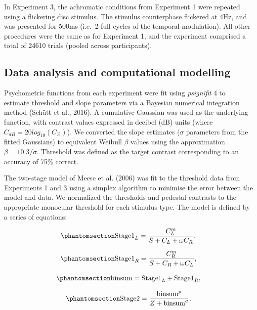 \documentclass[
  letterpaper,
  DIV=11,
  numbers=noendperiod]{scrartcl}
\begin{document}
In Experiment 3, the achromatic conditions from Experiment 1 were
repeated using a flickering disc stimulus. The stimulus counterphase
flickered at 4Hz, and was presented for 500ms (i.e.~2 full cycles of the
temporal modulation). All other procedures were the same as for
Experiment 1, and the experiment comprised a total of 24610 trials
(pooled across participants).

\subsection{Data analysis and computational
modelling}\label{data-analysis-and-computational-modelling}

Psychometric functions from each experiment were fit using
\emph{psignifit} 4 to estimate threshold and slope parameters via a
Bayesian numerical integration method (Schütt et al., 2016). A
cumulative Gaussian was used as the underlying function, with contrast
values expressed in decibel (dB) units (where
\(C_{dB} = 20log_{10}(C_\%)\)). We converted the slope estimates
(\(\sigma\) parameters from the fitted Gaussians) to equivalent Weibull
\(\beta\) values using the approximation \(\beta = 10.3/\sigma\).
Threshold was defined as the target contrast corresponding to an
accuracy of 75\% correct.

The two-stage model of Meese et al. (2006) was fit to the threshold data
from Experiments 1 and 3 using a simplex algorithm to minimise the error
between the model and data. We normalized the thresholds and pedestal
contrasts to the appropriate monocular threshold for each stimulus type.
The model is defined by a series of equations:

\begin{equation}\phantomsection\label{eq-s1l}{\mathrm{Stage1}_L = \frac{C_L^m}{S + C_L + \omega C_R},}\end{equation}

\begin{equation}\phantomsection\label{eq-s1r}{\mathrm{Stage1}_R = \frac{C_R^m}{S + C_R + \omega C_L},}\end{equation}

\begin{equation}\phantomsection\label{eq-binsum}{\mathrm{binsum} = \mathrm{Stage1}_L + \mathrm{Stage1}_R,}\end{equation}

\begin{equation}\phantomsection\label{eq-s2}{\mathrm{Stage2} = \frac{\mathrm{binsum}^p}{Z + \mathrm{binsum}^q},}\end{equation}
\end{document}
